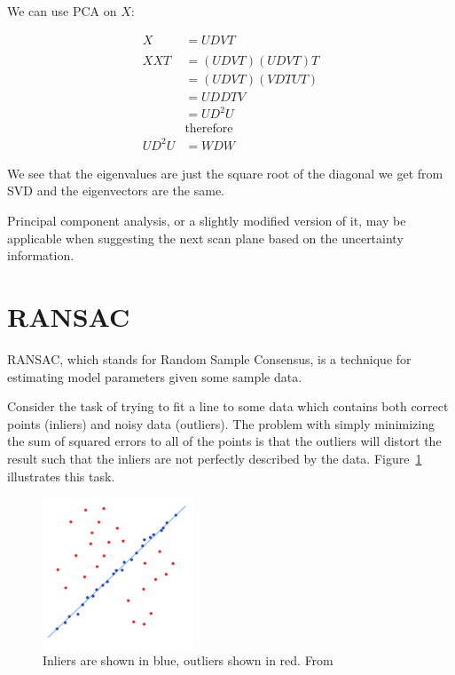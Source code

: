 We can use PCA on $X$:

\begin{align*}
X &= UDVT \\
& \\
XXT &= (UDVT)(UDVT)T \\
	&= (UDVT)(VDTUT) \\
	&= UDDTV \\
	&= UD^{2}U \\
	& \text{therefore} \\
UD^{2}U &= WDW
\end{align*}

We see that the eigenvalues are just the square root of the diagonal we get from SVD and the eigenvectors are the same.

Principal component analysis, or a slightly modified version of it, may be applicable when suggesting the next scan plane based on the uncertainty information.

\newpage
\section{RANSAC}
RANSAC, which stands for Random Sample Consensus, is a technique for estimating model parameters given some sample data.

Consider the task of trying to fit a line to some data which contains both correct points (inliers) and noisy data (outliers). The problem with simply minimizing the sum of squared errors to all of the points is that the outliers will distort the result such that the inliers are not perfectly described by the data. Figure~\ref{fig:ransac} illustrates this task.

\begin{figure}[h]
    \centering
	\includegraphics[width=0.4\textwidth]{images/ransac.png}
    \caption{Inliers are shown in blue, outliers shown in red. From \cite{ransac:image}}
    \label{fig:ransac}
\end{figure}

